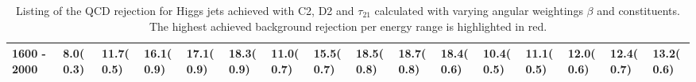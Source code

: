 \begin{table}
{\begin{tabular}{llllllllllllllll}
\multicolumn{1}{l||}{1600 - 2000}    & \multicolumn{1}{l|}{8.0(0.3)}         & \multicolumn{1}{l|}{11.7(0.5)} 		& \multicolumn{1}{l|}{16.1(0.9)} 		& \multicolumn{1}{l|}{17.1(0.9)} 								& \multicolumn{1}{l||}{18.3(0.9)} 						& \multicolumn{1}{l|}{11.0(0.7)}        	& \multicolumn{1}{l|}{15.5(0.7)} 	& \multicolumn{1}{l|}{18.5(0.8)} 						& \multicolumn{1}{l|}{\cellcolor{Red!50}18.7(0.8)} 	& \multicolumn{1}{l||}{18.4(0.6)} 						& \multicolumn{1}{l|}{10.4(0.5)}        & \multicolumn{1}{l|}{11.1(0.5)} 	& \multicolumn{1}{l|}{12.0(0.6)} 	& \multicolumn{1}{l|}{12.4(0.7)} 	& \multicolumn{1}{l|}{13.2(0.6)} \\ \hline
\end{tabular}}
\caption{Listing of the QCD rejection for Higgs jets achieved with C2, D2 and $\tau_{21}$ calculated with varying angular weightings $\beta$ and constituents. The highest achieved background rejection per energy range is highlighted in red.}\label{table:higgs_scan}
\end{table}
\FloatBarrier
